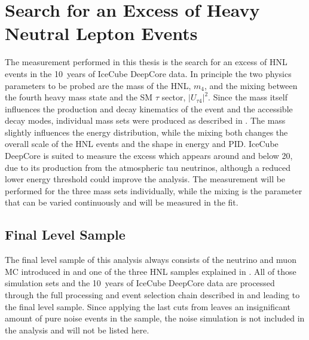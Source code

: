 \setchapterpreamble[u]{\margintoc}

\chapter{Search for an Excess of Heavy Neutral Lepton Events}

The measurement performed in this thesis is the search for an excess of HNL events in the \SI{10}{years} of IceCube DeepCore data. In principle the two physics parameters to be probed are the mass of the HNL, $m_4$, and the mixing between the fourth heavy mass state and the SM $\tau$ sector, $|U_{\tau4}|^2$. Since the mass itself influences the production and decay kinematics of the event and the accessible decay modes, individual mass sets were produced as described in . The mass slightly influences the energy distribution, while the mixing both changes the overall scale of the HNL events and the shape in energy and PID. IceCube DeepCore is suited to measure the excess which appears around and below \SI{20}{\gev}, due to its production from the atmospheric tau neutrinos, although a reduced lower energy threshold could improve the analysis. The measurement will be performed for the three mass sets individually, while the mixing is the parameter that can be varied continuously and will be measured in the fit. 


\section{Final Level Sample} 

The final level sample of this analysis always consists of the neutrino and muon MC introduced in  and one of the three HNL samples explained in . All of those simulation sets and the \SI{10}{years} of IceCube DeepCore data are processed through the full processing and event selection chain described in  and  leading to the final level sample. Since applying the last cuts from  leaves an insignificant amount of pure noise events in the sample, the noise simulation is not included in the analysis and will not be listed here.



